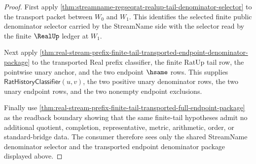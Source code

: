 \begin{proof}
First apply
\autoref{thm:streamname-regseqrat-realup-tail-denominator-selector} to the
transport packet between $W_0$ and $W_1$. This identifies the selected finite
public denominator selector carried by the StreamName side with the selector
read by the finite $\RealUp$ ledger at $W_1$.

Next apply
\autoref{thm:real-stream-prefix-finite-tail-transported-endpoint-denominator-package}
to the transported Real prefix classifier, the finite RatUp tail row, the
pointwise unary anchor, and the two endpoint $\hsame$ rows. This supplies
$\mathsf{RatHistoryClassifier}(u,v)$, the two positive unary denominator rows,
the two unary endpoint rows, and the two nonempty endpoint exclusions.

Finally use
\autoref{thm:real-stream-prefix-finite-tail-transported-full-endpoint-package}
as the readback boundary showing that the same finite-tail hypotheses admit no
additional quotient, completion, representative, metric, arithmetic, order, or
standard-bridge data. The consumer therefore sees only the shared StreamName
denominator selector and the transported endpoint denominator package displayed
above.
\end{proof}

